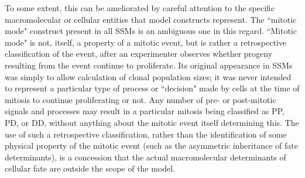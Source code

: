 \documentclass{ut-thesis}
\begin{document}
\begin{NoHyper}
To some extent, this can be ameliorated by careful attention to the specific macromolecular or cellular entities that model constructs represent. The ``mitotic mode" construct present in all SSMs is an ambiguous one in this regard. ``Mitotic mode" is not, itself, a property of a mitotic event, but is rather a retrospective classification of the event, after an experimenter observes whether progeny resulting from the event continue to proliferate. Its original appearance in SSMs was simply to allow calculation of clonal population sizes; it was never intended to represent a particular type of process or ``decision" made by cells at the time of mitosis to continue proliferating or not. Any number of pre- or post-mitotic signals and processes may result in a particular mitosis being classified as PP, PD, or DD, without anything about the mitotic event itself determining this. The use of such a retrospective classification, rather than the identification of some physical property of the mitotic event (such as the asymmetric inheritance of fate determinants), is a concession that the actual macromolecular determinants of cellular fate are outside the scope of the model.


\end{NoHyper}
\end{document}
